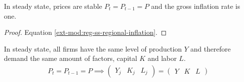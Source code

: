 \documentclass[../thesis.tex]{subfiles}
\begin{document}

\begin{lemma}\label{lemma:steady-state-inflation}
	
	In steady state, prices are stable $P_t = P_{t-1} = P$ and the gross inflation rate is one.
	\begin{proof} Equation \ref{ext-mod:reg-ss-regional-inflation}. \end{proof}  \end{lemma}

\begin{corollary}\label{coro:steady-state-YKL}
	
	In steady state, all firms have the same level of production $Y$ and therefore demand the same amount of factors, capital $K$ and labor $L$.
	\begin{align*}
		P_t = P_{t-1} = P \implies 
		\begin{pmatrix}
			Y_j & K_j & L_j
		\end{pmatrix} =
		\begin{pmatrix}
			Y & K & L
		\end{pmatrix}
	\end{align*}
	
\end{corollary}

\begin{comment}
	

\subsubsection*{Log-linearization}


\begin{definition}[PERCENTAGE DEVIATION]\label{def:percentage-deviation}
	
	The percentage deviation of a variable $x_t$ from its steady state is given by \cite[Lecture 6, p.2]{solis-garcia_ucb_2022}:
	\begin{align}
		\hat{x}_t \coloneq \frac{x_t - x}{x} \label{eq:percentage-deviation}
	\end{align}
	
\end{definition}

\end{comment}
\end{document}
